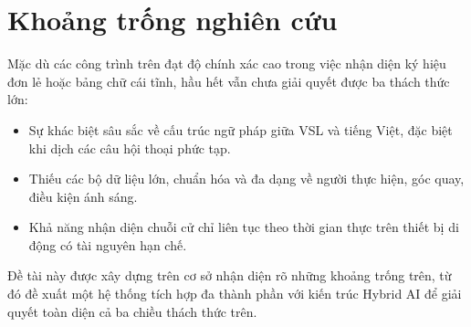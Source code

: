 \section{Khoảng trống nghiên cứu}
 
Mặc dù các công trình trên đạt độ chính xác cao trong việc nhận diện ký hiệu đơn lẻ hoặc bảng chữ cái tĩnh, hầu hết vẫn chưa giải quyết được ba thách thức lớn:
 
\begin{itemize}
    \item Sự khác biệt sâu sắc về cấu trúc ngữ pháp giữa VSL và tiếng Việt, đặc biệt khi dịch các câu hội thoại phức tạp.
 
    \item Thiếu các bộ dữ liệu lớn, chuẩn hóa và đa dạng về người thực hiện, góc quay, điều kiện ánh sáng.
 
    \item Khả năng nhận diện chuỗi cử chỉ liên tục theo thời gian thực trên thiết bị di động có tài nguyên hạn chế.
\end{itemize}
 
Đề tài này được xây dựng trên cơ sở nhận diện rõ những khoảng trống trên, từ đó đề xuất một hệ thống tích hợp đa thành phần với kiến trúc Hybrid AI để giải quyết toàn diện cả ba chiều thách thức trên.